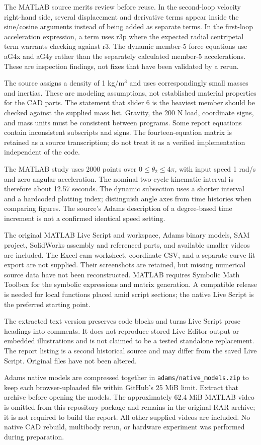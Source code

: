 \documentclass[11pt,a4paper]{article}
\begin{document}
The MATLAB source merits review before reuse. In the second-loop velocity right-hand side, several displacement and derivative terms appear inside the sine/cosine arguments instead of being added as separate terms. In the first-loop acceleration expression, a term uses r3p where the expected radial centripetal term warrants checking against r3. The dynamic member-5 force equations use aG4x and aG4y rather than the separately calculated member-5 accelerations. These are inspection findings, not fixes that have been validated by a rerun.

The source assigns a density of 1 kg/m$^3$ and uses correspondingly small masses and inertias. These are modeling assumptions, not established material properties for the CAD parts. The statement that slider 6 is the heaviest member should be checked against the supplied mass list. Gravity, the 200 N load, coordinate signs, and mass units must be consistent between programs. Some report equations contain inconsistent subscripts and signs. The fourteen-equation matrix is retained as a source transcription; do not treat it as a verified implementation independent of the code.

The MATLAB study uses 2000 points over $0\le\theta_2\le4\pi$, with input speed 1 rad/s and zero angular acceleration. The nominal two-cycle kinematic interval is therefore about 12.57 seconds. The dynamic subsection uses a shorter interval and a hardcoded plotting index; distinguish angle axes from time histories when comparing figures. The source's Adams description of a degree-based time increment is not a confirmed identical speed setting.

The original MATLAB Live Script and workspace, Adams binary models, SAM project, SolidWorks assembly and referenced parts, and available smaller videos are included. The Excel cam worksheet, coordinate CSV, and a separate curve-fit export are not supplied. Their screenshots are retained, but missing numerical source data have not been reconstructed. MATLAB requires Symbolic Math Toolbox for the symbolic expressions and matrix generation. A compatible release is needed for local functions placed amid script sections; the native Live Script is the preferred starting point.

The extracted text version preserves code blocks and turns Live Script prose headings into comments. It does not reproduce stored Live Editor output or embedded illustrations and is not claimed to be a tested standalone replacement. The report listing is a second historical source and may differ from the saved Live Script. Original files have not been altered.

Adams native models are compressed together in \texttt{adams/native\_models.zip} to keep each browser-uploaded file within GitHub's 25 MiB limit. Extract that archive before opening the models. The approximately 62.4 MiB MATLAB video is omitted from this repository package and remains in the original RAR archive; it is not required to build the report. All other supplied videos are included. No native CAD rebuild, multibody rerun, or hardware experiment was performed during preparation.
\end{document}
